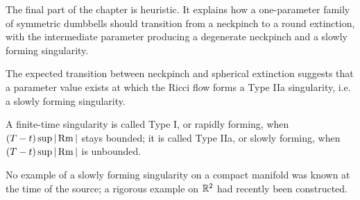The final part of the chapter is heuristic. It explains how a one-parameter
family of symmetric dumbbells should transition from a neckpinch to a round
extinction, with the intermediate parameter producing a degenerate neckpinch
and a slowly forming singularity.

\begin{remark}
\label{ch02-rem-degenerate-neckpinch-picture}
The expected transition between neckpinch and spherical extinction suggests
that a parameter value exists at which the Ricci flow forms a Type IIa
singularity, i.e. a slowly forming singularity.
\end{remark}

\begin{remark}
\label{ch02-rem-typei-typeiia}
A finite-time singularity is called Type I, or rapidly forming, when
\((T-t)\sup|\operatorname{Rm}|\) stays bounded; it is called Type IIa, or slowly forming, when
\((T-t)\sup|\operatorname{Rm}|\) is unbounded.
\end{remark}

\begin{remark}
\label{ch02-rem-slowly-forming-meaning}
No example of a slowly forming singularity on a compact manifold was known at
the time of the source; a rigorous example on \(\mathbb{R}^2\) had recently been
constructed.
\end{remark}

